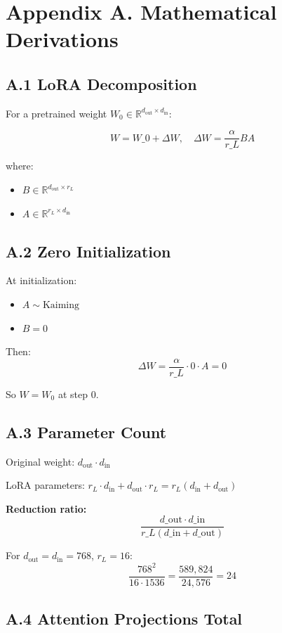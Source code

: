 \section{Appendix A. Mathematical Derivations}

\subsection{A.1 LoRA Decomposition}

For a pretrained weight $W_0 \in \mathbb{R}^{d_\text{out} \times d_\text{in}}$:

\[
W = W\_0 + \Delta W, \quad \Delta W = \frac{\alpha}{r\_L} B A
\tag{A.1}
\]

where:
\begin{itemize}
\item $B \in \mathbb{R}^{d_\text{out} \times r_L}$
\item $A \in \mathbb{R}^{r_L \times d_\text{in}}$

\end{itemize}
\subsection{A.2 Zero Initialization}

At initialization:
\begin{itemize}
\item $A \sim \text{Kaiming}$
\item $B = 0$

\end{itemize}
Then:
\[
\Delta W = \frac{\alpha}{r\_L} \cdot 0 \cdot A = 0
\tag{A.2}
\]

So $W = W_0$ at step 0.

\subsection{A.3 Parameter Count}

Original weight: $d_\text{out} \cdot d_\text{in}$

LoRA parameters: $r_L \cdot d_\text{in} + d_\text{out} \cdot r_L = r_L (d_\text{in} + d_\text{out})$

\textbf{Reduction ratio:}
\[
\frac{d\_\text{out} \cdot d\_\text{in}}{r\_L (d\_\text{in} + d\_\text{out})}
\tag{A.3}
\]

For $d_\text{out} = d_\text{in} = 768$, $r_L = 16$:
\[
\frac{768^2}{16 \cdot 1536} = \frac{589,824}{24,576} = 24
\tag{A.4}
\]

\subsection{A.4 Attention Projections Total}

